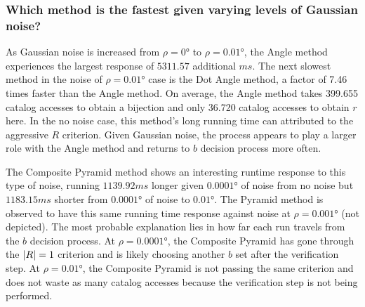 \subsubsection{Which method is the fastest given varying levels of Gaussian noise?}
As Gaussian noise is increased from $\rho=\ang{0}$ to $\rho=\ang{0.01}$, the Angle method experiences the largest
response of $5311.57$ additional $\si{ms}$.
The next slowest method in the noise of $\rho=\ang{0.01}$ case is the Dot Angle method, a factor of 7.46 times faster
than the Angle method.
On average, the Angle method takes 399.655 catalog accesses to obtain a bijection and only 36.720 catalog accesses
to obtain $r$ here.
In the no noise case, this method's long running time can attributed to the aggressive $R$ criterion.
Given Gaussian noise, the  process appears to play a larger role with the Angle method and returns to $b$
decision process more often.

The Composite Pyramid method shows an interesting runtime response to this type of noise, running $1139.92\si{ms}$
longer given $\ang{0.0001}$ of noise from no noise but $1183.15\si{ms}$ shorter from $\ang{0.0001}$ of noise to
$\ang{0.01}$.
The Pyramid method is observed to have this same running time response against noise at $\rho=\ang{0.001}$
(not depicted).
The most probable explanation lies in how far each run travels from the $b$ decision process.
At $\rho=\ang{0.0001}$, the Composite Pyramid has gone through the $\left| R \right| = 1$ criterion and is likely choosing
another $b$ set after the verification step.
At $\rho=\ang{0.01}$, the Composite Pyramid is not passing the same criterion and does not waste as many catalog
accesses because the verification step is not being performed.

